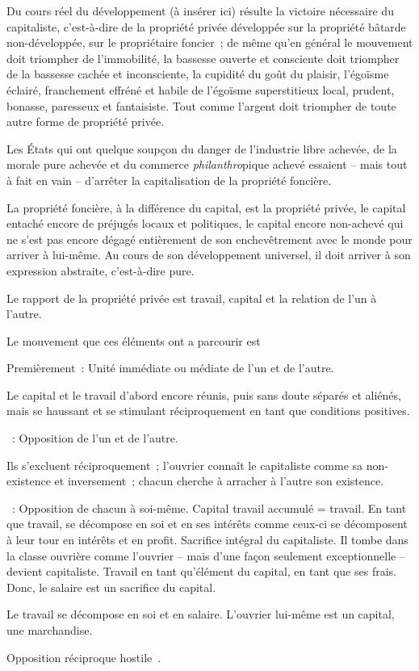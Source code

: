 \documentclass[french,twoside]{book} %
\begin{document}
Du cours réel du développement (à insérer ici) résulte la victoire nécessaire du capitaliste, c’est-à-dire de la propriété privée développée sur la propriété bâtarde non-développée, sur le propriétaire foncier ; de même qu’en général le mouvement doit triompher de l’immobilité, la bassesse ouverte et consciente doit triompher de la bassesse cachée et inconsciente, la cupidité du goût du plaisir, l’égoïsme éclairé, franchement effréné et habile de l’égoïsme superstitieux local, prudent, bonasse, paresseux et fantaisiste. Tout comme l’argent doit triompher de toute autre forme de propriété privée.\par
Les États qui ont quelque soupçon du danger de l’industrie libre achevée, de la morale pure achevée et du commerce \emph{philanthro}pique achevé essaient – mais tout à fait en vain – d’arrêter la capitalisation de la propriété foncière.\par
La propriété foncière, à la différence du capital, est la propriété privée, le capital entaché encore de préjugés locaux et politiques, le capital encore non-achevé qui ne s’est pas encore dégagé entièrement de son enchevêtrement avec le monde pour arriver à lui-même. Au cours de son développement universel, il doit arriver à son expression abstraite, c’est-à-dire pure.\par
Le rapport de la propriété privée est travail, capital et la relation de l’un à l’autre.\par
Le mouvement que ces éléments ont a parcourir est\par
Premièrement : Unité immédiate ou médiate de l’un et de l’autre.\par
Le capital et le travail d’abord encore réunis, puis sans doute séparés et aliénés, mais se haussant et se stimulant réciproquement en tant que conditions positives.\par
[Deuxièmement] : Opposition de l’un et de l’autre.\par
Ils s’excluent réciproquement ; l’ouvrier connaît le capitaliste comme sa non-existence et inversement ; chacun cherche à arracher à l’autre son existence.\par
[Troisièmement] : Opposition de chacun à soi-même. Capital travail accumulé = travail. En tant que travail, se décompose en soi et en ses intérêts comme ceux-ci se décomposent à leur tour en intérêts et en profit. Sacrifice intégral du capitaliste. Il tombe dans la classe ouvrière comme l’ouvrier – mais d’une façon seulement exceptionnelle – devient capitaliste. Travail en tant qu’élément du capital, en tant que ses frais. Donc, le salaire est un sacrifice du capital.\par
Le travail se décompose en soi et en salaire. L’ouvrier lui-même est un capital, une marchandise.\par
Opposition réciproque hostile .
\end{document}
